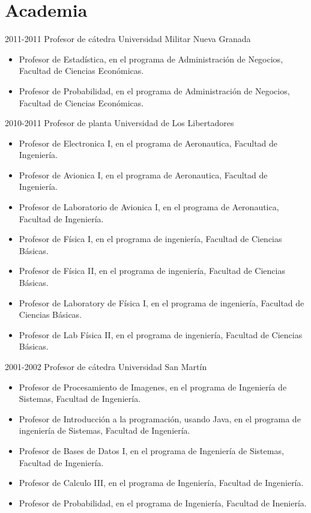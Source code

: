 \section{Academia}

\begin{entrylist}
  \entry
	{2011-2011}
	{Profesor de cátedra}
	{Universidad Militar Nueva Granada}
	{\begin{itemize}
	    \item Profesor de Estadística, en el programa de Administración de Negocios, Facultad
		    de Ciencias Económicas.
            \item Profesor de Probabilidad, en el programa de Administración de Negocios, Facultad
		    de Ciencias Económicas.
	\end{itemize}}
  \entry
	{2010-2011}
	{Profesor de planta}
	{Universidad de Los Libertadores}
	{\begin{itemize}
              \item Profesor de Electronica I, en el programa de Aeronautica, Facultad de
		      Ingeniería.
              \item Profesor de Avionica I, en el programa de Aeronautica, Facultad de
		      Ingeniería.
              \item Profesor de Laboratorio de Avionica I, en el programa de Aeronautica, Facultad de
		      Ingeniería.
              \item Profesor de Física I, en el programa de ingeniería, Facultad de
		      Ciencias Básicas.
              \item Profesor de Física II, en el programa de ingeniería, Facultad de
		      Ciencias Básicas.
              \item Profesor de Laboratory de Física I, en el programa de ingeniería, Facultad de
		      Ciencias Básicas.
              \item Profesor de Lab Física II, en el programa de ingeniería, Facultad de
		      Ciencias Básicas.
	\end{itemize}}

  \entry
        {2001-2002}
	{Profesor de cátedra}
	{Universidad San Martín}
	{\begin{itemize}
              \item Profesor de Procesamiento de Imagenes, en el programa de Ingeniería de Sistemas,
Facultad de Ingeniería.
              \item Profesor de Introducción a la programación, usando Java, en el programa de
		      ingeniería de Sistemas, Facultad de Ingeniería.
              \item Profesor de Bases de Datos I, en el programa de Ingeniería de Sistemas, Facultad
		      de Ingeniería.
              \item Profesor de Calculo III, en el programa de Ingeniería, Facultad de Ingeniería.
              \item Profesor de Probabilidad, en el programa de Ingeniería, Facultad de Ineniería.
	\end{itemize}}


\end{entrylist}

